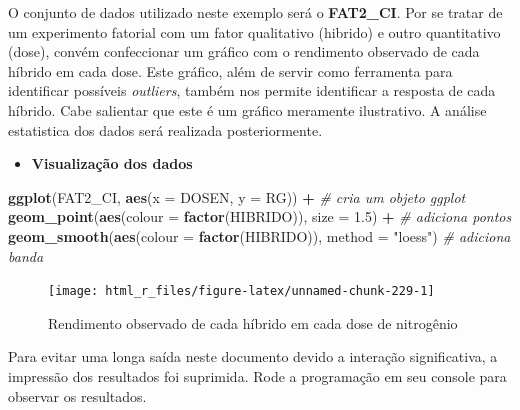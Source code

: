 \documentclass[
]{book}
\newenvironment{Shaded}{\begin{snugshade}}{\end{snugshade}}
\newcommand{\CommentTok}[1]{\textcolor[rgb]{0.56,0.35,0.01}{\textit{#1}}}
\newcommand{\DataTypeTok}[1]{\textcolor[rgb]{0.13,0.29,0.53}{#1}}
\newcommand{\FloatTok}[1]{\textcolor[rgb]{0.00,0.00,0.81}{#1}}
\newcommand{\KeywordTok}[1]{\textcolor[rgb]{0.13,0.29,0.53}{\textbf{#1}}}
\newcommand{\NormalTok}[1]{#1}
\newcommand{\OperatorTok}[1]{\textcolor[rgb]{0.81,0.36,0.00}{\textbf{#1}}}
\newcommand{\StringTok}[1]{\textcolor[rgb]{0.31,0.60,0.02}{#1}}
\providecommand{\tightlist}{%
  \setlength{\itemsep}{0pt}\setlength{\parskip}{0pt}}
\begin{document}
O conjunto de dados utilizado neste exemplo será o \textbf{FAT2\_CI}. Por se tratar de um experimento fatorial com um fator qualitativo (hibrido) e outro quantitativo (dose), convém confeccionar um gráfico com o rendimento observado de cada híbrido em cada dose. Este gráfico, além de servir como ferramenta para identificar possíveis \emph{outliers}, também nos permite identificar a resposta de cada híbrido. Cabe salientar que este é um gráfico meramente ilustrativo. A análise estatistica dos dados será realizada posteriormente.

\begin{itemize}
\tightlist
\item
  \textbf{Visualização dos dados}
\end{itemize}

\begin{Shaded}
\begin{Highlighting}[]
\KeywordTok{ggplot}\NormalTok{(FAT2_CI, }\KeywordTok{aes}\NormalTok{(}\DataTypeTok{x =}\NormalTok{ DOSEN, }\DataTypeTok{y =}\NormalTok{ RG)) }\OperatorTok{+}\StringTok{ }\CommentTok{# cria um objeto ggplot}
\StringTok{       }\KeywordTok{geom_point}\NormalTok{(}\KeywordTok{aes}\NormalTok{(}\DataTypeTok{colour =} \KeywordTok{factor}\NormalTok{(HIBRIDO)), }\DataTypeTok{size =} \FloatTok{1.5}\NormalTok{) }\OperatorTok{+}\StringTok{ }\CommentTok{# adiciona pontos}
\StringTok{       }\KeywordTok{geom_smooth}\NormalTok{(}\KeywordTok{aes}\NormalTok{(}\DataTypeTok{colour =} \KeywordTok{factor}\NormalTok{(HIBRIDO)), }\DataTypeTok{method =} \StringTok{"loess"}\NormalTok{) }\CommentTok{# adiciona banda}
\end{Highlighting}
\end{Shaded}

\begin{figure}

{\centering \texttt{[image: html\_r\_files/figure-latex/unnamed-chunk-229-1]} 

}

\caption{Rendimento observado de cada híbrido em cada dose de nitrogênio}\label{fig:unnamed-chunk-229}
\end{figure}

\begin{importante}
Para evitar uma longa saída neste documento devido a interação significativa, a impressão dos resultados foi suprimida. Rode a programação em seu console para observar os resultados.
\end{importante}
\end{document}
